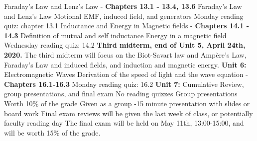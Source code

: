 \documentclass[10pt]{article}
\begin{document}
\begin{outline}[enumerate]
\2 Faraday's Law and Lenz's Law - \textbf{Chapters 13.1 - 13.4, 13.6}
\3 Faraday's Law and Lenz's Law
\3 Motional EMF, induced field, and generators
\3 Monday reading quiz: chapter 13.1
\2 Inductance and Energy in Magnetic fields - \textbf{Chapters 14.1 - 14.3}
\3 Definition of mutual and self inductance
\3 Energy in a magnetic field
\3 Wednesday reading quiz: 14.2
\1 \textbf{Third midterm, end of Unit 5, April 24th, 2020.} The third midterm will focus on the Biot-Savart law and Amp\`{e}re's Law, Faraday's Law and induced fields, and induction and magnetic energy.
\1 \textbf{Unit 6:} Electromagnetic Waves
\2 Derivation of the speed of light and the wave equation - \textbf{Chapters 16.1-16.3}
\2 Monday reading quiz: 16.2
\1 \textbf{Unit 7:} Cumulative Review, group presentations, and final exam
\2 No reading quizzes
\2 Group presentations
\3 Worth 10\% of the grade
\3 Given as a group
-15 minute presentation with slides or board work
\3 Final exam reviews will be given the last week of class, or potentially faculty reading day
\3 The final exam will be held on May 11th, 13:00-15:00, and will be worth 15\% of the grade.
\end{outline}
\end{document}
